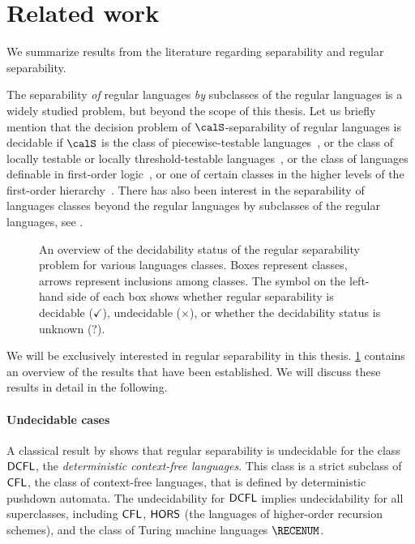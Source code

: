 \documentclass[../../diss.tex]{subfiles}
\begin{document}
\section{Related work}%
\label{Sectiopn:SeparabilityRelatedWork}%

We summarize results from the literature regarding separability and regular separability.

The separability \emph{of} regular languages \emph{by} subclasses of the regular languages is a widely studied problem, but beyond the scope of this thesis.
Let us briefly mention that the decision problem of $\calS$-separability of regular languages is decidable if $\calS$ is the class of piecewise-testable languages~\cite{CzerwinskiMM13,PlaceVZ13}, or the class of locally testable or locally threshold-testable languages~\cite{PlaceVZ13b}, or the class of  languages definable in first-order logic~\cite{PlaceZ14}, or one of certain classes in the higher levels of the first-order hierarchy~\cite{PlaceZ14b}.
There has also been interest in the separability of languages classes beyond the regular languages by subclasses of the regular languages, see \eg \cite{CzerwinskiMRZZ17}.

\begin{figure}
    \centering%
    \caption{An overview of the decidability status of the regular separability problem for various languages classes. Boxes represent classes, arrows represent inclusions among classes. The symbol on the left-hand side of each box shows whether regular separability is decidable ($\checkmark$), undecidable ($\bm\times$), or whether the decidability status is unknown ($\bm?$).}%
    \label{Figure:RegularSeparabilityRelatedWork}%
\end{figure}

We will be exclusively interested in regular separability in this thesis.
\cref{Figure:RegularSeparabilityRelatedWork} contains an overview of the results that have been established.
We will discuss these results in detail in the following.

\paragraph{Undecidable cases}

A classical result by  shows that regular separability is undecidable for the class ${\mathsf{DCFL}}$, the \emph{deterministic context-free languages}.
This class is a strict subclass of ${\mathsf{CFL}}$, the class of context-free languages, that is defined by deterministic pushdown automata.
The undecidability for ${\mathsf{DCFL}}$ implies undecidability for all superclasses, including ${\mathsf{CFL}}$, ${\mathsf{HORS}}$ (the languages of higher-order recursion schemes), and the class of Turing machine languages $\RECENUM$.
\end{document}
